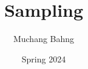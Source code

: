 \documentclass{article}
\begin{document}
\title{Sampling}
\author{Muchang Bahng}
\date{Spring 2024}

\maketitle
\tableofcontents
\pagebreak 







\end{document}
